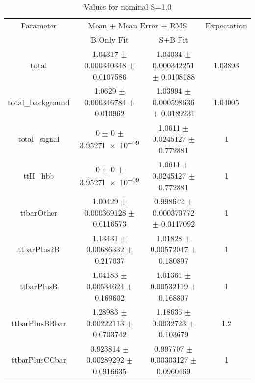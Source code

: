 \begin{table}
\centering
\caption{Values for nominal S=1.0}
\begin{tabular}{cccc}
\toprule
Parameter & \multicolumn{2}{c}{Mean $\pm$ Mean Error $\pm$ RMS} & Expectation\\
 & B-Only Fit & S+B Fit & \\
\midrule
total & \num{1.04317} $\pm$ \num{0.000340348} $\pm$ \num{0.0107586} & \num{1.04034} $\pm$ \num{0.000342251} $\pm$ \num{0.0108188} & \num{1.03893}\\
total\_background & \num{1.0629} $\pm$ \num{0.000346784} $\pm$ \num{0.010962} & \num{1.03994} $\pm$ \num{0.000598636} $\pm$ \num{0.0189231} & \num{1.04005}\\
total\_signal & \num{0} $\pm$ \num{0} $\pm$ \num{3.95271e-09} & \num{1.0611} $\pm$ \num{0.0245127} $\pm$ \num{0.772881} & \num{1}\\
ttH\_hbb & \num{0} $\pm$ \num{0} $\pm$ \num{3.95271e-09} & \num{1.0611} $\pm$ \num{0.0245127} $\pm$ \num{0.772881} & \num{1}\\
ttbarOther & \num{1.00429} $\pm$ \num{0.000369128} $\pm$ \num{0.0116573} & \num{0.998642} $\pm$ \num{0.000370772} $\pm$ \num{0.0117092} & \num{1}\\
ttbarPlus2B & \num{1.13431} $\pm$ \num{0.00686332} $\pm$ \num{0.217037} & \num{1.01828} $\pm$ \num{0.00572047} $\pm$ \num{0.180897} & \num{1}\\
ttbarPlusB & \num{1.04183} $\pm$ \num{0.00534624} $\pm$ \num{0.169602} & \num{1.01361} $\pm$ \num{0.00532119} $\pm$ \num{0.168807} & \num{1}\\
ttbarPlusBBbar & \num{1.28983} $\pm$ \num{0.00222113} $\pm$ \num{0.0703742} & \num{1.18636} $\pm$ \num{0.0032723} $\pm$ \num{0.103679} & \num{1.2}\\
ttbarPlusCCbar & \num{0.923814} $\pm$ \num{0.00289292} $\pm$ \num{0.0916635} & \num{0.997707} $\pm$ \num{0.00303127} $\pm$ \num{0.0960469} & \num{1}\\
\bottomrule
\end{tabular}
\end{table}